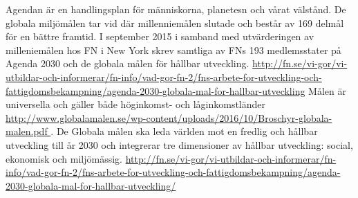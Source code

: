 \documentclass{report}
\begin{document}
Agendan\cite{nam2015transforming} är en handlingsplan för människorna, planetesn och vårat välstånd. De globala miljömålen tar vid där millenniemålen slutade och består av 169 delmål för en bättre framtid. I september 2015 i samband med utvärderingen av milleniemålen hos FN i New York skrev samtliga av FNs 193 medlemsstater på Agenda 2030 och de globala målen för hållbar utveckling. \url{ http://fn.se/vi-gor/vi-utbildar-och-informerar/fn-info/vad-gor-fn-2/fns-arbete-for-utveckling-och-fattigdomsbekampning/agenda-2030-globala-mal-for-hallbar-utveckling} Målen är universella och gäller både höginkomst- och låginkomstländer \url{http://www.globalamalen.se/wp-content/uploads/2016/10/Broschyr-globala-malen.pdf }. De Globala målen ska leda världen mot en fredlig och hållbar utveckling till år 2030 och integrerar tre dimensioner av hållbar utveckling: social, ekonomisk och miljömässig.  \url{http://fn.se/vi-gor/vi-utbildar-och-informerar/fn-info/vad-gor-fn-2/fns-arbete-for-utveckling-och-fattigdomsbekampning/agenda-2030-globala-mal-for-hallbar-utveckling/}
 
\end{document}
